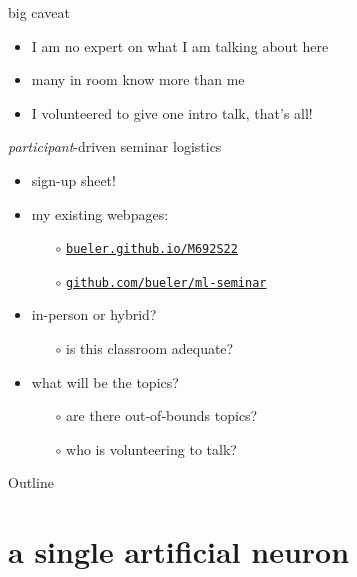 \documentclass[xcolor={svgnames},
               hyperref={colorlinks,citecolor=DeepPink4,linkcolor=FireBrick,urlcolor=Maroon}]
               {beamer}
\begin{document}
\begin{frame}{big caveat}

\begin{itemize}
\item I am no expert on what I am talking about here
\item many in room know more than me
\item I volunteered to give one intro talk, that's all!
\end{itemize}
\end{frame}


\begin{frame}{\emph{participant}-driven seminar logistics}

\begin{itemize}
\item sign-up sheet!
\item my existing webpages:
    \begin{itemize}
    \item[$\circ$] \href{http://bueler.github.io/M692S22/index.html}{\texttt{bueler.github.io/M692S22}}
    \item[$\circ$] \href{https://github.com/bueler/ml-seminar}{\texttt{github.com/bueler/ml-seminar}}
    \end{itemize}
\item in-person or hybrid?
    \begin{itemize}
    \item[$\circ$] is this classroom adequate?
    \end{itemize}
\item what will be the topics?
    \begin{itemize}
    \item[$\circ$] are there out-of-bounds topics?
    \item[$\circ$] who is volunteering to talk?
    \end{itemize}
\end{itemize}
\end{frame}


\begin{frame}{Outline}
  \tableofcontents[hideallsubsections]
\end{frame}

\section{a single artificial neuron}
\end{document}
